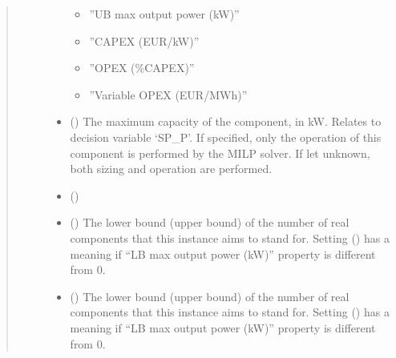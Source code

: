 \documentclass[letterpaper,10pt,english]{sphinxmanual}
\begin{document}
\begin{fulllineitems}
\begin{fulllineitems}
\begin{quote}
\begin{description}
\begin{itemize}
\begin{itemize}
\item {} 
\sphinxAtStartPar
”UB max output power (kW)”

\item {} 
\sphinxAtStartPar
”CAPEX (EUR/kW)”

\item {} 
\sphinxAtStartPar
”OPEX (\%CAPEX)”

\item {} 
\sphinxAtStartPar
”Variable OPEX (EUR/MWh)”

\end{itemize}


\item {} 
\sphinxAtStartPar
{} (\sphinxstyleliteralemphasis{\sphinxupquote{, }}) \textendash{} The maximum capacity of the component, in kW.
Relates to decision variable ‘SP\_P’.
If specified, only the operation of this component is performed by the MILP solver.
If let unknown, both sizing and operation are performed.

\item {} 
\sphinxAtStartPar
{} (\sphinxstyleliteralemphasis{\sphinxupquote{, }}) \textendash{} 

\item {} 
\sphinxAtStartPar
{} (\sphinxstyleliteralemphasis{\sphinxupquote{, }}\sphinxstyleliteralemphasis{\sphinxupquote{, }}) \textendash{} The lower bound (upper bound) of the number of real components that this instance aims to stand for.
Setting  () has a meaning if “LB max output power (kW)” property is
different from 0.

\item {} 
\sphinxAtStartPar
{} (\sphinxstyleliteralemphasis{\sphinxupquote{, }}\sphinxstyleliteralemphasis{\sphinxupquote{, }}) \textendash{} The lower bound (upper bound) of the number of real components that this instance aims to stand for.
Setting  () has a meaning if “LB max output power (kW)” property is
different from 0.


\end{itemize}
\end{description}
\end{quote}
\end{fulllineitems}
\end{fulllineitems}
\end{document}
